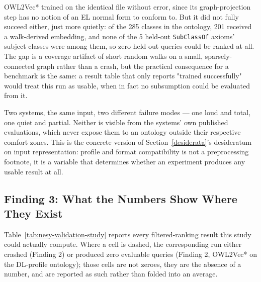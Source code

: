 OWL2Vec* trained on the identical file without error, since its graph-projection step has no notion of an EL normal form to conform to. But it did not fully succeed either, just more quietly: of the 285 classes in the ontology, 201 received a walk-derived embedding, and none of the 5 held-out \texttt{SubClassOf} axioms' subject classes were among them, so zero held-out queries could be ranked at all. The gap is a coverage artifact of short random walks on a small, sparsely-connected graph rather than a crash, but the practical consequence for a benchmark is the same: a result table that only reports "trained successfully" would treat this run as usable, when in fact no subsumption could be evaluated from it.

Two systems, the same input, two different failure modes — one loud and total, one quiet and partial. Neither is visible from the systems' own published evaluations, which never expose them to an ontology outside their respective comfort zones. This is the concrete version of Section~\ref{desiderata}'s desideratum on input representation: profile and format compatibility is not a preprocessing footnote, it is a variable that determines whether an experiment produces any usable result at all.

\subsection{Finding 3: What the Numbers Show Where They Exist}

Table~\ref{tab:nesy-validation-study} reports every filtered-ranking result this study could actually compute. Where a cell is dashed, the corresponding run either crashed (Finding 2) or produced zero evaluable queries (Finding 2, OWL2Vec* on the DL-profile ontology); those cells are not zeroes, they are the absence of a number, and are reported as such rather than folded into an average.

